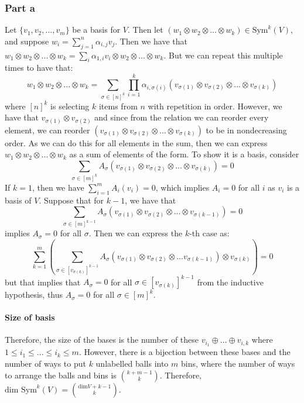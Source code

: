 \documentclass[]{article}
\begin{document}
\subsubsection*{Part a}
Let $\lbrace v_1, v_2, ..., v_m \rbrace$ be a basis for $V$. Then let $(w_1 \otimes w_2 \otimes ... \otimes w_k) \in \text{Sym}^k(V)$, and suppose $w_i = \sum_{j = 1}^n \alpha_{i,j} v_j$. Then we have that $w_1 \otimes w_2 \otimes ... \otimes w_k = \sum_{i} \alpha_{1, i} v_i \otimes w_2 \otimes ... \otimes w_k$. But we can repeat this multiple times to have that:
\begin{equation}
	w_1 \otimes w_2 \otimes ... \otimes w_k = \sum_{\sigma \in [n]^k} \prod_{i = 1}^k \alpha_{i,\sigma(i)} (v_{\sigma(1)} \otimes v_{\sigma(2)} \otimes ... \otimes v_{\sigma(k)})
\end{equation}
where $[n]^k$ is selecting $k$ items from $n$ with repetition in order. However, we have that $v_{\sigma(1)} \otimes v_{\sigma(2)}$ and since from the relation we can reorder every element, we can reorder $(v_{\sigma(1)} \otimes v_{\sigma(2)} \otimes ... \otimes v_{\sigma(k)})$ to be in nondecreasing order. As we can do this for all elements in the sum, then we can express $w_1 \otimes w_2 \otimes ... \otimes w_k$ as a sum of elements of the form. To show it is a basis, consider
\begin{equation}
	\sum_{\sigma \in [m]^k} A_{\sigma} (v_{\sigma(1)} \otimes v_{\sigma(2)} \otimes ... \otimes v_{\sigma(k)}) = 0
\end{equation}
If $k = 1$, then we have $\sum_{i = 1}^m A_{i} (v_{i}) = 0$, which implies $A_i = 0$ for all $i$ as $v_i$ is a basis of $V$. Suppose that for $k-1$, we have that
\begin{equation}
	\sum_{\sigma \in [m]^{k-1}} A_{\sigma} (v_{\sigma(1)} \otimes v_{\sigma(2)} \otimes ... \otimes v_{\sigma(k-1)}) = 0
\end{equation}
implies $A_{\sigma} = 0$ for all $\sigma$. Then we can express the $k$-th case as:
\begin{equation}
	 \sum_{k = 1}^m (\sum_{\sigma \in [v_{\sigma(k)}]^{k-1}} A_{\sigma}(v_{\sigma(1)} \otimes v_{\sigma(2)} \otimes ... v_{\sigma(k-1)}) \otimes v_{\sigma(k)}) = 0
\end{equation}
but that implies that $A_{\sigma} = 0$ for all $\sigma \in [v_{\sigma(k)}]^{k-1}$ from the inductive hypothesis, thus $A_{\sigma} = 0$ for all $\sigma \in [m]^k$.
\paragraph{Size of basis}
Therefore, the size of the bases is the number of these $v_{i_1} \oplus ... \oplus v_{i, k}$ where $1 \leq i_1 \leq ... \leq i_k \leq m$. However, there is a bijection between these bases and the number of ways to put $k$ unlabelled balls into $m$ bins, where the number of ways to arrange the balls and bins is $\binom{k + m - 1}{k}$. Therefore, $\text{dim Sym}^k (V) = \binom{\text{dim} V + k - 1}{k}$.
\end{document}
